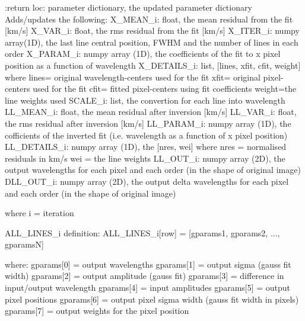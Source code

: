 \begin{minipage}{\textwidth}
\begin{pythondocstring}
:return loc: parameter dictionary, the updated parameter dictionary
        Adds/updates the following:
            X_MEAN_i: float, the mean residual from the fit [km/s]
            X_VAR_i: float, the rms residual from the fit [km/s]
            X_ITER_i: numpy array(1D), the last line central position, FWHM
            and the number of lines in each order
            X_PARAM_i: numpy array (1D), the coefficients of the fit to x
                       pixel position as a function of wavelength
            X_DETAILS_i: list, [lines, xfit, cfit, weight] where
                         lines= original wavelength-centers used for the fit
                         xfit= original pixel-centers used for the fit
                         cfit= fitted pixel-centers using fit coefficients
                         weight=the line weights used
            SCALE_i: list, the convertion for each line into wavelength
            LL_MEAN_i: float, the mean residual after inversion [km/s]
            LL_VAR_i: float, the rms residual after inversion [km/s]
            LL_PARAM_i: numpy array (1D), the cofficients of the inverted
                        fit (i.e. wavelength as a function of x pixel
                        position)
            LL_DETAILS_i: numpy array (1D), the [nres, wei] where
                          nres = normalised residuals in km/s
                          wei = the line weights
            LL_OUT_i: numpy array (2D), the output wavelengths for each
                      pixel and each order (in the shape of original image)
            DLL_OUT_i: numpy array (2D), the output delta wavelengths for
                       each pixel and each order (in the shape of original
                       image)

            where i = iteration

ALL_LINES_i definition:
    ALL_LINES_i[row] = [gparams1, gparams2, ..., gparamsN]

                where:
                    gparams[0] = output wavelengths
                    gparams[1] = output sigma (gauss fit width)
                    gparams[2] = output amplitude (gauss fit)
                    gparams[3] = difference in input/output wavelength
                    gparams[4] = input amplitudes
                    gparams[5] = output pixel positions
                    gparams[6] = output pixel sigma width
                                      (gauss fit width in pixels)
                    gparams[7] = output weights for the pixel position
\end{pythondocstring}
\end{minipage}

